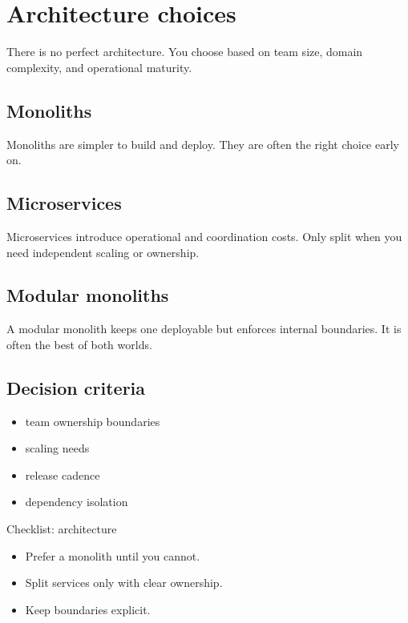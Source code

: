 \chapter{Architecture choices}

There is no perfect architecture.
You choose based on team size, domain complexity, and operational maturity.

\section{Monoliths}
Monoliths are simpler to build and deploy.
They are often the right choice early on.

\section{Microservices}
Microservices introduce operational and coordination costs.
Only split when you need independent scaling or ownership.

\section{Modular monoliths}
A modular monolith keeps one deployable but enforces internal boundaries.
It is often the best of both worlds.

\section{Decision criteria}
\begin{itemize}[nosep]
  \item team ownership boundaries
  \item scaling needs
  \item release cadence
  \item dependency isolation
\end{itemize}

\begin{checklistbox}{Checklist: architecture}
\begin{itemize}[nosep]
  \item Prefer a monolith until you cannot.
  \item Split services only with clear ownership.
  \item Keep boundaries explicit.
\end{itemize}
\end{checklistbox}
